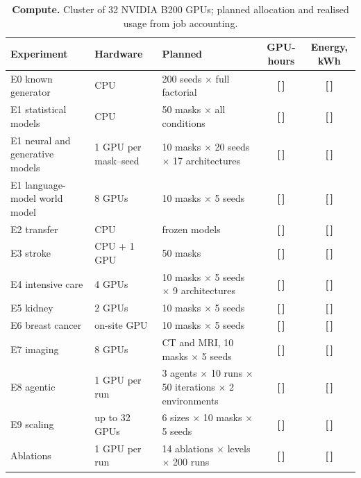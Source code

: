 \documentclass[11pt,a4paper]{article}
\newcommand{\T}{{\color{red}\textbf{[\,]}}}
\begin{document}
\begin{table}[!htbp]\centering\scriptsize
\caption{\textbf{Compute.} Cluster of 32 NVIDIA B200 GPUs; planned allocation and realised usage from job accounting.}
\begin{tabularx}{\textwidth}{@{}p{3.2cm} p{2.2cm} Y c c@{}}\toprule
Experiment & Hardware & Planned & GPU-hours & Energy, kWh\\\midrule
E0 known generator & CPU & 200 seeds $\times$ full factorial & \T & \T\\
E1 statistical models & CPU & 50 masks $\times$ all conditions & \T & \T\\
E1 neural and generative models & 1 GPU per mask--seed & 10 masks $\times$ 20 seeds $\times$ 17 architectures & \T & \T\\
E1 language-model world model & 8 GPUs & 10 masks $\times$ 5 seeds & \T & \T\\
E2 transfer & CPU & frozen models & \T & \T\\
E3 stroke & CPU + 1 GPU & 50 masks & \T & \T\\
E4 intensive care & 4 GPUs & 10 masks $\times$ 5 seeds $\times$ 9 architectures & \T & \T\\
E5 kidney & 2 GPUs & 10 masks $\times$ 5 seeds & \T & \T\\
E6 breast cancer & on-site GPU & 10 masks $\times$ 5 seeds & \T & \T\\
E7 imaging & 8 GPUs & CT and MRI, 10 masks $\times$ 5 seeds & \T & \T\\
E8 agentic & 1 GPU per run & 3 agents $\times$ 10 runs $\times$ 50 iterations $\times$ 2 environments & \T & \T\\
E9 scaling & up to 32 GPUs & 6 sizes $\times$ 10 masks $\times$ 5 seeds & \T & \T\\
Ablations & 1 GPU per run & 14 ablations $\times$ levels $\times$ 200 runs & \T & \T\\
\bottomrule\end{tabularx}
\end{table}
\FloatBarrier
\end{document}
